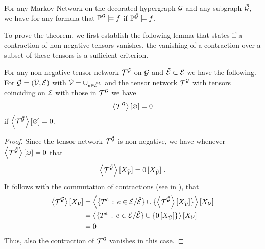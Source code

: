 \begin{theorem}
    \label{the:monotonEntailment}
    For any Markov Network on the decorated hypergraph $\mathcal{G}$ and any subgraph $\tilde{\mathcal{G}}$, we have for any formula that $\mathbb{P}^{\mathcal{G}}\models f$ if $\mathbb{P}^{\tilde{\mathcal{G}}}\models f$.
\end{theorem}

To prove the theorem, we first establish the following lemma that states if a contraction of non-negative tensors vanishes, the vanishing of a contraction over a subset of these tensors is a sufficient criterion.

\begin{lemma}
    \label{lem:monotocityOfVanishingContractions}
    For any non-negative tensor network $\mathcal{T}^{\mathcal{G}}$ on $\mathcal{G}$ and $\tilde{\mathcal{E}}\subset\mathcal{E}$ we have the following.
    For $\tilde{\mathcal{G}}=(\tilde{\mathcal{V}},\tilde{\mathcal{E}})$ with $\tilde{\mathcal{V}}=\cup_{e\in\tilde{\mathcal{E}}}e$ and the tensor network $\mathcal{T}^{\tilde{\mathcal{G}}}$ with tensors coinciding on $\tilde{\mathcal{E}}$ with those in $\mathcal{T}^{\mathcal{G}}$ we have
    \begin{align*}
        \left\langle \mathcal{T}^{\mathcal{G}}\right\rangle \left[ \varnothing \right] = 0
    \end{align*}
    if $\left\langle \mathcal{T}^{\tilde{\mathcal{G}}}\right\rangle \left[ \varnothing \right]=0$.
\end{lemma}
\begin{proof}
    Since the tensor network $\mathcal{T}^{\tilde{\mathcal{G}}}$ is non-negative, we have whenever $\left\langle \mathcal{T}^{\tilde{\mathcal{G}}}\right\rangle \left[ \varnothing \right]=0$ that
    \begin{align*}
        \left\langle \mathcal{T}^{\tilde{\mathcal{G}}}\right\rangle \left[ X_{\tilde{\mathcal{V}}} \right] = 0\left[X_{\tilde{\mathcal{V}}}\right] \, .
    \end{align*}
    It follows with the commutation of contractions (see  in ), that
    \begin{align*}
        \left\langle \mathcal{T}^{\mathcal{G}}\right\rangle \left[ X_{\mathcal{V}} \right]
        &= \left\langle 
            \{T^{e} \, : \, e\in\mathcal{E}/\tilde{\mathcal{E}}\}
            \cup \{\left\langle \mathcal{T}^{\tilde{\mathcal{G}}}\right\rangle \left[ X_{\tilde{\mathcal{V}}} \right]\}
        \right\rangle \left[ X_{\mathcal{V}} \right] \\
        &=    \left\langle 
            \{T^{e} \, : \, e\in\mathcal{E}/\tilde{\mathcal{E}}\}
            \cup \{0\left[X_{\tilde{\mathcal{V}}}\right]\}
        \right\rangle \left[ X_{\mathcal{V}} \right] \\
        &= 0
    \end{align*}
    Thus, also the contraction of $\mathcal{T}^{\mathcal{G}}$ vanishes in this case.
\end{proof}

